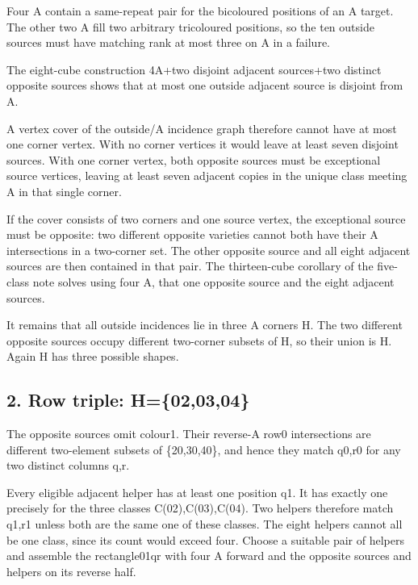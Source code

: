 \documentclass[
  10pt,
]{article}
\begin{document}
Four A contain a same-repeat pair for the bicoloured positions of an A
target. The other two A fill two arbitrary tricoloured positions, so the
ten outside sources must have matching rank at most three on A in a
failure.

The eight-cube construction 4A+two disjoint adjacent sources+two
distinct opposite sources shows that at most one outside adjacent source
is disjoint from A.

A vertex cover of the outside/A incidence graph therefore cannot have at
most one corner vertex. With no corner vertices it would leave at least
seven disjoint sources. With one corner vertex, both opposite sources
must be exceptional source vertices, leaving at least seven adjacent
copies in the unique class meeting A in that single corner.

If the cover consists of two corners and one source vertex, the
exceptional source must be opposite: two different opposite varieties
cannot both have their A intersections in a two-corner set. The other
opposite source and all eight adjacent sources are then contained in
that pair. The thirteen-cube corollary of the five-class note solves
using four A, that one opposite source and the eight adjacent sources.

It remains that all outside incidences lie in three A corners H. The two
different opposite sources occupy different two-corner subsets of H, so
their union is H. Again H has three possible shapes.

\hypertarget{row-triple-h020304}{%
\subsection*{2. Row triple: H=\{02,03,04\}}\label{row-triple-h020304}}

The opposite sources omit colour1. Their reverse-A row0 intersections
are different two-element subsets of \{20,30,40\}, and hence they match
q0,r0 for any two distinct columns q,r.

Every eligible adjacent helper has at least one position q1. It has
exactly one precisely for the three classes C(02),C(03),C(04). Two
helpers therefore match q1,r1 unless both are the same one of these
classes. The eight helpers cannot all be one class, since its count
would exceed four. Choose a suitable pair of helpers and assemble the
rectangle01\textbar qr with four A forward and the opposite sources and
helpers on its reverse half.
\end{document}
